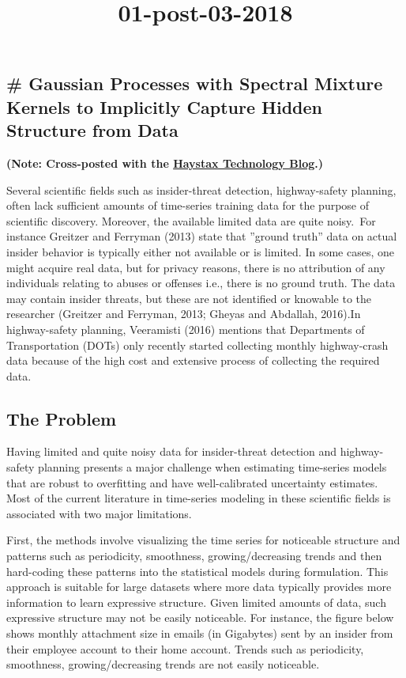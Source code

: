 \documentclass[11pt]{article}
\title{01-post-03-2018}
\begin{document}
    
    
    \maketitle
    
    

    
    \subsection{\# Gaussian Processes with Spectral Mixture Kernels to
Implicitly Capture Hidden Structure from
Data}\label{gaussian-processes-with-spectral-mixture-kernels-to-implicitly-capture-hidden-structure-from-data}

    \textbf{(Note: Cross-posted with the
\href{https://wp.me/p7rVtH-1Fv}{Haystax Technology Blog}.)}

Several scientific fields such as insider-threat detection,
highway-safety planning, often lack sufficient amounts of time-series
training data for the purpose of scientific discovery. Moreover, the
available limited data are quite noisy.~For instance Greitzer and
Ferryman (2013) state that ''ground truth'' data on actual insider
behavior is typically either not available or is limited. In some cases,
one might acquire real data, but for privacy reasons, there is no
attribution of any individuals relating to abuses or offenses i.e.,
there is no ground truth. The data may contain insider threats, but
these are not identified or knowable to the researcher (Greitzer and
Ferryman, 2013; Gheyas and Abdallah, 2016).In highway-safety planning,
Veeramisti (2016) mentions that Departments of Transportation (DOTs)
only recently started collecting monthly highway-crash data because of
the high cost and extensive process of collecting the required data.

\subsection{The Problem}\label{the-problem}

Having limited and quite noisy data for insider-threat detection and
highway-safety planning presents a major challenge when estimating
time-series models that are robust to overfitting and have
well-calibrated uncertainty estimates. Most of the current literature in
time-series modeling in these scientific fields is associated with two
major limitations.

First, the methods involve visualizing the time series for noticeable
structure and patterns such as periodicity, smoothness,
growing/decreasing trends and then hard-coding these patterns into the
statistical models during formulation. This approach is suitable for
large datasets where more data typically provides more information to
learn expressive structure. Given limited amounts of data, such
expressive structure may not be easily noticeable. For instance, the
figure below shows monthly attachment size in emails (in Gigabytes) sent
by an insider from their employee account to their home account. Trends
such as periodicity, smoothness, growing/decreasing trends are not
easily noticeable.
\end{document}
